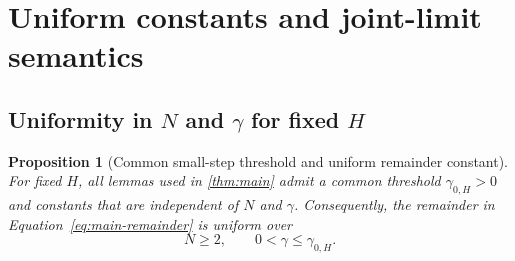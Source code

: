 \documentclass[11pt]{article}
\newtheorem{proposition}[proposition]{Proposition}
\theoremstyle{definition}
\begin{document}
\section{Uniform constants and joint-limit semantics}
\label{sec:uniformity}

\subsection{Uniformity in \texorpdfstring{$N$ and $\gamma$}{N and gamma} for fixed \texorpdfstring{$H$}{H}}

\begin{proposition}[Common small-step threshold and uniform remainder constant]
\label{prop:uniformity}
For fixed $H$, all lemmas used in \cref{thm:main} admit a common threshold $\gamma_{0, H}>0$ and constants that are independent of $N$ and $\gamma$. Consequently, the remainder in Equation~\eqref{eq:main-remainder} is uniform over
\[
  N\ge2,\qquad 0<\gamma\le\gamma_{0,H}.
\]
\end{proposition}
\end{document}
